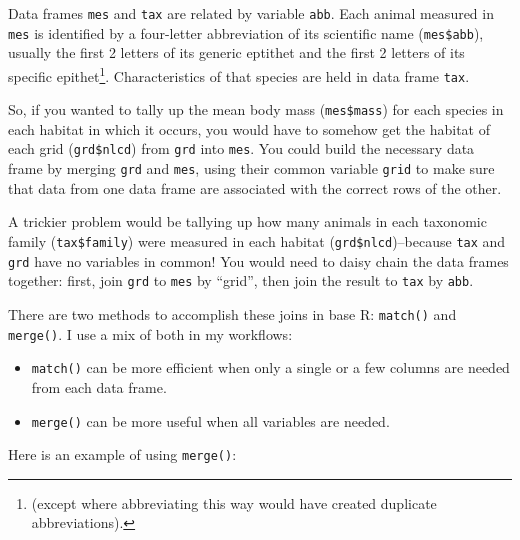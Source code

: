\documentclass[
  13,
  letterpaper,
]{report}
\begin{document}
Data frames \texttt{mes} and \texttt{tax} are related by variable
\texttt{abb}. Each animal measured in \texttt{mes} is identified by a
four-letter abbreviation of its scientific name (\texttt{mes\$abb}),
usually the first 2 letters of its generic eptithet and the first 2
letters of its specific epithet\footnote{(except where abbreviating this
  way would have created duplicate abbreviations).}. Characteristics of
that species are held in data frame \texttt{tax}.

So, if you wanted to tally up the mean body mass (\texttt{mes\$mass})
for each species in each habitat in which it occurs, you would have to
somehow get the habitat of each grid (\texttt{grd\$nlcd}) from
\texttt{grd} into \texttt{mes}. You could build the necessary data frame
by merging \texttt{grd} and \texttt{mes}, using their common variable
\texttt{grid} to make sure that data from one data frame are associated
with the correct rows of the other.

A trickier problem would be tallying up how many animals in each
taxonomic family (\texttt{tax\$family}) were measured in each habitat
(\texttt{grd\$nlcd})--because \texttt{tax} and \texttt{grd} have no
variables in common! You would need to daisy chain the data frames
together: first, join \texttt{grd} to \texttt{mes} by ``grid'', then
join the result to \texttt{tax} by \texttt{abb}.

There are two methods to accomplish these joins in base R:
\texttt{match()} and \texttt{merge()}. I use a mix of both in my
workflows:

\begin{itemize}
\item
  \texttt{match()} can be more efficient when only a single or a few
  columns are needed from each data frame.
\item
  \texttt{merge()} can be more useful when all variables are needed.
\end{itemize}

Here is an example of using \texttt{merge()}:
\end{document}
